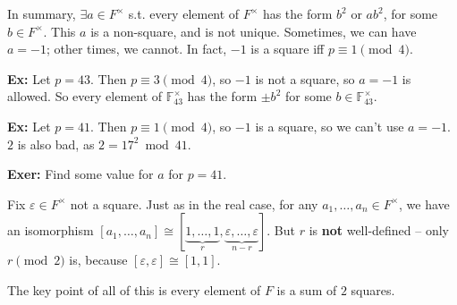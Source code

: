 \documentclass[10pt,letterpaper]{article}
\newcommand{\n}{\hfill\break}
\newcommand{\hangblock}[2]{\par\noindent\settowidth{\hangindent}{\textbf{#1: }}\textbf{#1: }\!\!\!#2}
\newcommand{\ex}[1]{\hangblock{Ex}{#1}}
\newcommand{\exer}[1]{\hangblock{Exer}{#1}}
\newcommand{\F}{\mathbb{F}}
\newcommand{\st}{s.t.}
\begin{document}
\par\noindent
In summary, $\exists{}a\in{}F^{\times}$ \st{} every element of $F^{\times}$ has the form $b^{2}$ or $ab^{2}$, for some $b\in{}F^{\times}$. This $a$ is a non-square, and is not unique. Sometimes, we can have $a=-1$; other times, we cannot. In fact, $-1$ is a square iff $p\equiv{}1\pmod{4}$.\n

\ex{
	Let $p=43$. Then $p\equiv{}3\pmod{4}$, so $-1$ is not a square, so $a=-1$ is allowed. So every element of $\F_{43}^{\times}$ has the form $\pm{}b^{2}$ for some $b\in\F_{43}^{\times}$.\n
}

\ex{
	Let $p=41$. Then $p\equiv{}1\pmod{4}$, so $-1$ is a square, so we can't use $a=-1$. $2$ is also bad, as\n
	$2=17^{2}\bmod{41}$.\n
}

\exer{
	Find some value for $a$ for $p=41$.\n
}

\par\noindent
Fix $\varepsilon\in{}F^{\times}$ not a square. Just as in the real case, for any $a_{1},\ldots,a_{n}\in{}F^{\times}$, we have an isomorphism $[a_{1},\ldots,a_{n}]\cong[\underbrace{1,\ldots,1}_{r},\underbrace{\varepsilon,\ldots,\varepsilon}_{n-r}]$. But $r$ is \textbf{not} well-defined -- only $r\pmod{2}$ is, because $[\varepsilon,\varepsilon]\cong[1,1]$.\n

\par\noindent
The key point of all of this is every element of $F$ is a sum of $2$ squares.
\end{document}
